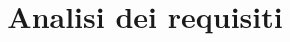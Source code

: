 \documentclass[12pt]{article}
\title{Analisi dei requisiti}
\begin{document}
	\makefirstpage
	
	
	\clearpage
	
	\tableofcontents
	\clearpage
	

	
	\clearpage
	
	
\end{document}
